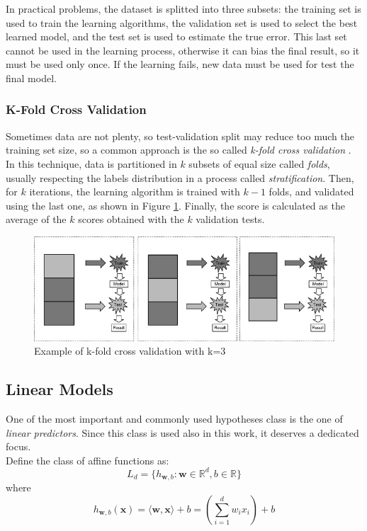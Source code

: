 In practical problems, the dataset is splitted into three subsets: the training set is used to train the learning algorithms, the validation set is used to select the best learned model, and the test set is used to estimate the true error. This last set cannot be used in the learning process, otherwise it can bias the final result, so it must be used only once. If the learning fails, new data must be used for test the final model.


\subsubsection{K-Fold Cross Validation}
Sometimes data are not plenty, so test-validation split may reduce too much the training set size, so a common approach is the so called \textit{k-fold cross validation} \cite{Refaeilzadeh2009}. In this technique, data is partitioned in $k$ subsets of equal size called \textit{folds}, usually respecting the labels distribution in a process called \textit{stratification}. Then, for $k$ iterations, the learning algorithm is trained with $k-1$ folds, and validated using the last one, as shown in Figure \ref{fig:kfold}. Finally, the score is calculated as the average of the $k$ scores obtained with the $k$ validation tests. 

\begin{figure}[ht]
	\centering
	\includegraphics[width=1\textwidth]{figures/kfold.jpg}
	\caption{Example of k-fold cross validation with k=3}
	\label{fig:kfold}
\end{figure}


\subsection{Linear Models}
One of the most important and commonly used hypotheses class is the one of \textit{linear predictors}. Since this class is used also in this work, it deserves a dedicated focus.\\
Define the class of affine functions as:
\[ L_d = \{h_{\textbf{w},b} : \mathbf{w} \in \mathbb{R}^d, b \in \mathbb{R} \} \]
where
\[ h_{\mathbf{w}, b}(\mathbf{x}) = \langle \mathbf{w},\mathbf{x} \rangle + b = \left( \sum_{i=1}^{d} w_i x_i \right) + b \]

